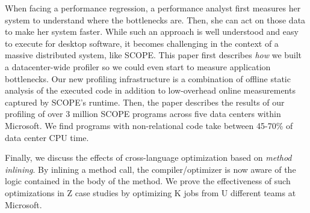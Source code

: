 


When facing a performance regression, a performance analyst first measures her system to understand where the bottlenecks are.  Then, she can act on those data to make her system faster.  While such an approach is well understood and easy to execute for desktop software, it becomes challenging in the context of a massive distributed system, like SCOPE.
This paper first describes \emph{how} we built a datacenter-wide profiler so we could even start to measure application bottlenecks.
Our new profiling infrastructure is a combination of offline static analysis of the executed code in addition to low-overhead online measurements captured by SCOPE's runtime.
Then, the paper describes the results of our profiling of over 3 million SCOPE programs across five data centers within Microsoft.
We find programs with non-relational code take between 45-70\% of data center CPU time.  

Finally, we discuss the effects of cross-language optimization based on \emph{method inlining}. 
By inlining a method call, the compiler/optimizer is now aware of the logic contained in the body of the method. 
We prove the effectiveness of such optimizations in Z case studies by optimizing K jobs from U different teams at Microsoft. 


